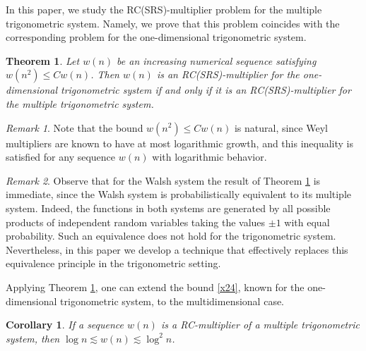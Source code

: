 \documentclass[12pt,reqno,fleqn]{amsart}
\theoremstyle{plain} %
\newtheorem{theorem}{Theorem} [section]
\newtheorem{corollary}{Corollary} [section]
\theoremstyle{remark}
\newtheorem{remark}{Remark}
\theoremstyle{plain}
\numberwithin{equation}{section}
\newcommand {\e }[1]{\eqref{#1}}
\newcommand {\trm }[1]{Theorem \ref{#1}}
\begin{document}
In this paper, we study the RC(SRS)-multiplier problem for the multiple trigonometric system. Namely, we prove that this problem coincides with the corresponding problem for the one-dimensional trigonometric system.
\begin{theorem}\label{T1}
	Let $w(n)$ be an increasing numerical sequence satisfying $w(n^2)\le Cw(n)$. Then $w(n)$ is an RC(SRS)-multiplier for the one-dimensional trigonometric system if and only if it is an RC(SRS)-multiplier for the multiple trigonometric system.
\end{theorem}
\begin{remark}
	Note that the bound $w(n^2)\le Cw(n)$ is natural, since Weyl multipliers are known to have at most logarithmic growth, and this inequality is satisfied for any sequence $w(n)$ with logarithmic behavior.  
\end{remark}
\begin{remark}
	Observe that for the Walsh system the result of \trm{T1} is immediate, since the Walsh system is probabilistically equivalent to its multiple system. Indeed, the functions in both systems are generated by all possible products of independent random variables taking the values $\pm1$ with equal probability. Such an equivalence does not hold for the trigonometric system. Nevertheless, in this paper we develop a technique that effectively replaces this equivalence principle in the trigonometric setting.
\end{remark}
Applying \trm{T1}, one can extend the bound \e{x24}, known for the one-dimensional trigonometric system, to the multidimensional case.
\begin{corollary}
	If a sequence $w(n)$ is a RC-multiplier of a multiple trigonometric system, then $\log n\lesssim w(n)\lesssim \log^2 n$.  
\end{corollary}
\end{document}
